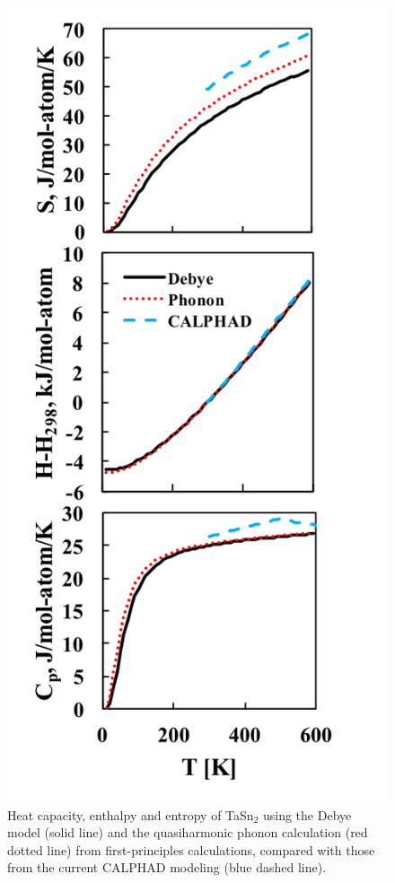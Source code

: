 \pagebreak
\begin{figure}[H]
	\centering
	\includegraphics[scale=1.0]{Chapter-4/Figures/TaSn2finitetemp.png}
	\caption{Heat capacity, enthalpy and entropy of TaSn$_2$ using the Debye model (solid line) and the quasiharmonic phonon calculation (red dotted line) from first-principles calculations, compared with those from the current CALPHAD modeling (blue dashed line).}
	\label{Ch4-figure:TaSn2finitetemp}
\end{figure}

